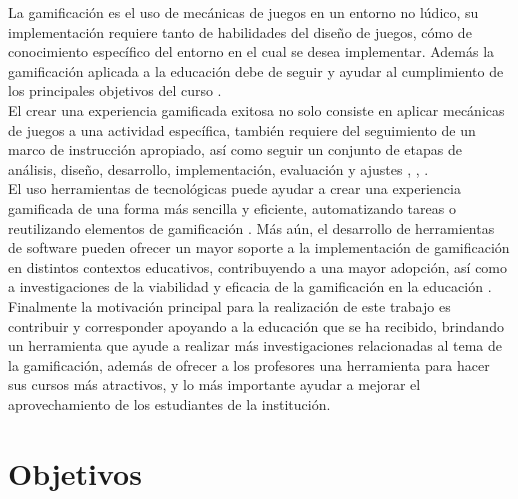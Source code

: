  \noindent La gamificación es el uso de mecánicas de juegos en un entorno no lúdico,
 su implementación requiere tanto de habilidades del diseño de juegos, cómo de
 conocimiento específico del entorno en el cual se desea implementar. Además la
 gamificación aplicada a la educación debe de seguir y ayudar al cumplimiento de los
 principales objetivos del curso \cite{ForTheWin}.\\


 \noindent El crear una experiencia gamificada exitosa no solo consiste en aplicar
 mecánicas de juegos a una actividad específica, también requiere del seguimiento de
 un marco de instrucción apropiado, así como seguir un conjunto de etapas de análisis,
 diseño, desarrollo, implementación, evaluación y ajustes
 \cite[p. 39]{Octalysis}, \cite[p. 1110]{GamInE-Learning}, \cite{ForTheWin}.\\


 \noindent El uso herramientas de tecnológicas puede ayudar a crear una experiencia
 gamificada de una forma más sencilla y eficiente, automatizando tareas o reutilizando
 elementos de gamificación \cite{Wood-Reiners}. Más aún, el desarrollo de herramientas
 de software pueden ofrecer un mayor soporte a la implementación de gamificación
 en distintos contextos educativos, contribuyendo a una mayor adopción, así como a
 investigaciones de la viabilidad y eficacia de la gamificación en la educación
 \cite[p. 10]{mappingStudy}.\\


 \noindent Finalmente la motivación principal para la realización de este trabajo es
 contribuir y corresponder apoyando a la educación que se ha recibido, brindando un
 herramienta que ayude a realizar más investigaciones relacionadas al tema de la
 gamificación, además de ofrecer a los profesores una herramienta para hacer sus
 cursos más atractivos, y lo más importante ayudar a mejorar el aprovechamiento de
 los estudiantes de la institución.                     %

\section{Objetivos} \label{sec:objetivos}

